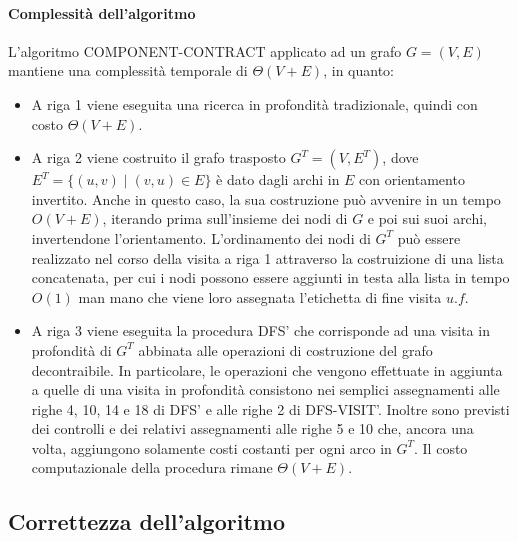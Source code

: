     \paragraph{Complessit\`a dell'algoritmo}
    L'algoritmo COMPONENT-CONTRACT applicato ad un grafo $G = (V, E)$  mantiene una complessit\`a temporale di
    $\Theta(V + E)$, in quanto:
    \begin{itemize}
        \item A riga 1 viene eseguita una ricerca in profondit\`a tradizionale, quindi con costo $\Theta(V + E)$.
        \item A riga 2 viene costruito il grafo trasposto $G^T = (V, E^T)$, dove $E^T = \{(u, v) \mid (v, u) \in E\}$ \`e
        dato dagli archi in $E$ con orientamento invertito.
        Anche in questo caso, la sua costruzione pu\`o avvenire in un tempo $O(V + E)$, iterando prima sull'insieme dei
        nodi di $G$ e poi sui suoi archi, invertendone l'orientamento.
        L'ordinamento dei nodi di $G^T$ pu\`o essere realizzato nel corso della visita a riga 1 attraverso la costruizione
        di una lista concatenata, per cui i nodi possono essere aggiunti in testa alla lista in tempo $O(1)$  man mano
        che viene loro assegnata l'etichetta di fine visita $u.f$.
        \item A riga 3 viene eseguita la procedura DFS' che corrisponde ad una visita in profondit\`a di $G^T$ abbinata
        alle operazioni di costruzione del grafo decontraibile.
        In particolare, le operazioni che vengono effettuate in aggiunta a quelle di una visita in profondit\`a consistono
        nei semplici assegnamenti alle righe 4, 10, 14 e 18 di DFS' e alle righe
        2 di DFS-VISIT'.
        Inoltre sono previsti dei controlli e dei relativi assegnamenti alle righe 5 e 10 che,
        ancora una volta, aggiungono solamente costi costanti per ogni arco in $G^T$.
        Il costo computazionale della procedura rimane $\Theta(V + E)$.
    \end{itemize}

    \subsection{Correttezza dell'algoritmo}\label{subsec:correttezza-dell'algoritmo}

